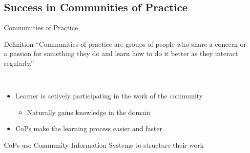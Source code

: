 \subsection{Success in Communities of Practice}

\begin{frame}{Communities of Practice}
  \begin{block}{Definition}
    ``Communities of practice are groups of people who share a concern or a
    passion for something they do and learn how to do it better as they interact regularly.'' \cite{Weng98}
  \end{block}
  \ \\
  \begin{itemize}
    \item Learner is actively participating in the work of the community
    \begin{itemize}
        \item Naturally gains knowledge in the domain
    \end{itemize}
    \item CoPs make the learning process easier and faster \cite{CuZe05}
    
  \end{itemize}

   CoPs use Community Information Systems to structure their work
\end{frame}



